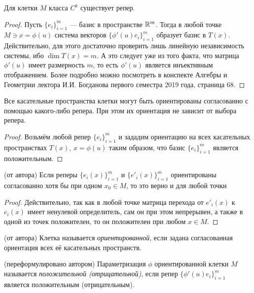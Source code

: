 \begin{proposition}
	Для клетки $M$ класса $C^k$ существует репер.
\end{proposition}

\begin{proof}
	Пусть $\{e_i\}_{i = 1}^m$ --- базис в пространстве $\mathbb{R}^m$. Тогда в любой точке $M \ni x = \phi(u)$ система векторов $\{\phi'(u)e_i\}_{i = 1}^m$ образует базис в $T(x)$. Действительно, для этого достаточно проверить лишь линейную независимость системы, ибо $\dim T(x) = m$. А это следует уже из того факта, что матрица $\phi'(u)$ имеет размерность $m$, то есть $\phi'(u)$ является инъективным отображением. Более подробно можно посмотреть в конспекте Алгебры и Геометрии лектора И.И. Богданова первого семестра 2019 года, страница 68.
\end{proof}

\begin{proposition}
	Все касательные пространства клетки могут быть ориентированы согласованно с помощью какого-либо репера. При этом их ориентация не зависит от выбора репера.
\end{proposition}

\begin{proof}
	Возьмём любой репер $\{e_i\}_{i = 1}^m$ и зададим ориентацию на всех касательных пространствах $T(x)$, $x = \phi(u)$ таким образом, что базис $\{e_i\}_{i = 1}^m$ является положительным.
\end{proof}

\begin{proposition} (от автора)
	Если реперы $\{e_i(x)\}_{i = 1}^m$ и $\{e'_i(x)\}_{i = 1}^m$ ориентированы согласованно хотя бы при одном $x_0 \in M$, то это верно и для любой точки
\end{proposition}

\begin{proof}
	Действительно, так как в любой точке матрица перехода от $e'_i(x)$ к $e_i(x)$ имеет ненулевой определитель, сам он при этом непрерывен, а также в одной из точек положителен, то он положителен при любом $x \in M$.
\end{proof}

\begin{definition} (от автора)
	Клетка называется \textit{ориентированной}, если задана согласованная ориентация всех её касательных пространств.
\end{definition}

\begin{definition} (переформулировано автором)
	Параметризация $\phi$ ориентированной клетки $M$ называется \textit{положительной (отрицательной)}, если репер $\{\phi'(u)e_i\}_{i = 1}^m$ является положительным (отрицательным).
\end{definition}

